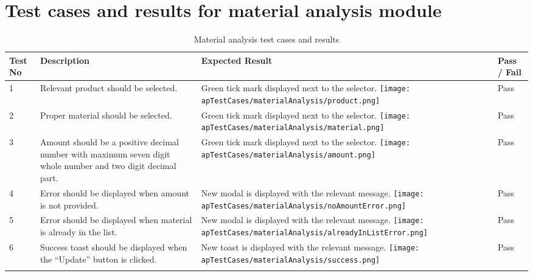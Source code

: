 \documentclass[12pt]{report}
\begin{document}
\section{Test cases and results for material analysis module}

\begin{longtable}{ | p{1cm} | p{5cm} | p{5cm} | p{2cm} | }
	\hline
	\bf{Test No} & \bf{Description} & \bf{Expected Result} & \bf{Pass / Fail} \\
	\hline
	1
	             &
	Relevant product should be selected.
	             &
	Green tick mark displayed next to the selector.\newline
	\texttt{[image: apTestCases/materialAnalysis/product.png]}
	             &
	Pass                                                                      \\
	\hline
	2
	             &
	Proper material should be selected.
	             &
	Green tick mark displayed next to the selector.\newline
	\texttt{[image: apTestCases/materialAnalysis/material.png]}
	             &
	Pass                                                                      \\
	\hline
	3
	             &
	Amount should be a positive decimal number with maximum seven digit whole number and two digit decimal part.
	             &
	Green tick mark displayed next to the selector.\newline
	\texttt{[image: apTestCases/materialAnalysis/amount.png]}
	             &
	Pass                                                                      \\
	\hline
	4
	             &
	Error should be displayed when amount is not provided.
	             &
	New modal is displayed with the relevant message.\newline
	\texttt{[image: apTestCases/materialAnalysis/noAmountError.png]}
	             &
	Pass                                                                      \\
	\hline
	5
	             &
	Error should be displayed when material is already in the list.
	             &
	New modal is displayed with the relevant message.\newline
	\texttt{[image: apTestCases/materialAnalysis/alreadyInListError.png]}
	             &
	Pass                                                                      \\
	\hline
	6
	             &
	Success toast should be displayed when the ``Update'' button is clicked.
	             &
	New toast is displayed with the relevant message.\newline
	\texttt{[image: apTestCases/materialAnalysis/success.png]}
	             &
	Pass                                                                      \\
	\hline
	\caption{Material analysis test cases and results}
\end{longtable}
\end{document}
